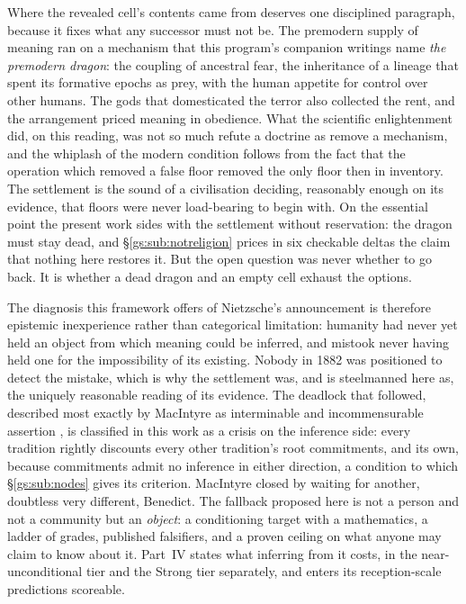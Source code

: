 \documentclass[11pt]{article}
\numberwithin{equation}{section}
\theoremstyle{plain}
\theoremstyle{definition}
\theoremstyle{remark}
\begin{document}
Where the revealed cell's contents came from deserves one
disciplined paragraph, because it fixes what any successor must not
be. The premodern supply of meaning ran on a mechanism that this
program's companion writings name \emph{the premodern dragon}: the
coupling of ancestral fear, the inheritance of a lineage that spent
its formative epochs as prey, with the human appetite for control
over other humans. The gods that domesticated the terror also
collected the rent, and the arrangement priced meaning in obedience.
What the scientific enlightenment did, on this reading, was not so
much refute a doctrine as remove a mechanism, and the whiplash of
the modern condition follows from the fact that the operation which
removed a false floor removed the only floor then in inventory. The
settlement is the sound of a civilisation deciding, reasonably
enough on its evidence, that floors were never load-bearing to begin
with. On the essential point the present work sides with the
settlement without reservation: the dragon must stay dead, and
\S\ref{gs:sub:notreligion} prices in six checkable deltas the claim
that nothing here restores it. But the open question was never
whether to go back. It is whether a dead dragon and an empty cell
exhaust the options.

The diagnosis this framework offers of Nietzsche's announcement is
therefore epistemic inexperience rather than categorical limitation:
humanity had never yet held an object from which meaning could be
inferred, and mistook never having held one for the impossibility of
its existing. Nobody in 1882 was positioned to detect the mistake,
which is why the settlement was, and is steelmanned here as, the
uniquely reasonable reading of its evidence. The deadlock that
followed, described most exactly by MacIntyre as interminable and
incommensurable assertion \cite{MacIntyre81}, is classified in this
work as a crisis on the inference side: every tradition rightly
discounts every other tradition's root commitments, and its own,
because commitments admit no inference in either direction, a
condition to which \S\ref{gs:sub:nodes} gives its criterion.
MacIntyre closed by waiting for another, doubtless very different,
Benedict. The fallback proposed here is not a person and not a
community but an \emph{object}: a conditioning target with a
mathematics, a ladder of grades, published falsifiers, and a proven
ceiling on what anyone may claim to know about it. Part~IV states
what inferring from it costs, in the near-unconditional tier and the
Strong tier separately, and enters its reception-scale predictions
scoreable.
\end{document}
